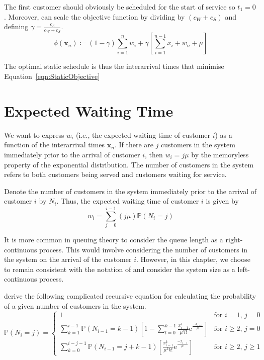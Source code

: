 The first customer should obviously be scheduled for the start of service so $t_{1} = 0$. Moreover, can scale the objective function by dividing by $(c_{W} + c_{S})$ and defining $\gamma = \frac{c_{S}}{c_{W} + c_{S}}$.
\begin{equation}
	\phi (\mathbf{x}_{n}) \coloneqq (1 - \gamma) \sum_{i = 1}^{n} w_{i} + \gamma \left[ \sum_{i = 1}^{n - 1} x_{i} + w_{n} + \mu \right]
	\label{eqn:StaticObjective}
\end{equation}

The optimal static schedule is thus the interarrival times that minimise Equation~\ref{eqn:StaticObjective}

\section{Expected Waiting Time}
We want to express $w_{i}$ (i.e., the expected waiting time of customer $i$) as a function of the interarrival times $\mathbf{x}_{n}$. If there are $j$ customers in the system immediately prior to the arrival of customer $i$, then $w_{i} = j \mu$ by the memoryless property of the exponential distribution. The number of customers in the system refers to both customers being served and customers waiting for service.

Denote the number of customers in the system immediately prior to the arrival of customer $i$ by $N_{i}$. Thus, the expected waiting time of customer $i$ is given by
\begin{equation}
	w_{i} = \sum_{j = 0}^{i - 1} (j \mu) \mathbb{P} (N_{i} = j)
\end{equation}

It is more common in queuing theory to consider the queue length as a right-continuous process. This would involve considering the number of customers in the system on the arrival of the customer $i$. However, in this chapter, we choose to remain consistent with the notation of \citet{Pegden} and consider the system size as a left-continuous process.

\citet{Pegden} derive the following complicated recursive equation for calculating the probability of a given number of customers in the system.
\begin{equation}
	\mathbb{P} (N_{i} = j) = \begin{cases} 1 & \text{for $i = 1$, $j = 0$} \\
	\sum_{k = 1}^{i - 1} \mathbb{P} (N_{i - 1} = k - 1) \left[ 1 - \sum_{l = 0}^{k - 1} \frac{x_{i - 1}^{l}}{\mu^{l} l!} \mathrm{e}^{\frac{- x_{i - 1}}{\mu}}\right] & \text{for $i \geq 2$, $j = 0$} \\
	\sum_{k = 0}^{i - j - 1} \mathbb{P} (N_{i - 1} = j + k - 1) \left[ \frac{x_{i - 1}^{k}}{\mu^{k} k!} \mathrm{e}^{\frac{- x_{i - 1}}{\mu}} \right] & \text{for $i \geq 2$, $j \geq 1$} \end{cases}
	\label{eqn:StaticProbSystem}
\end{equation}

